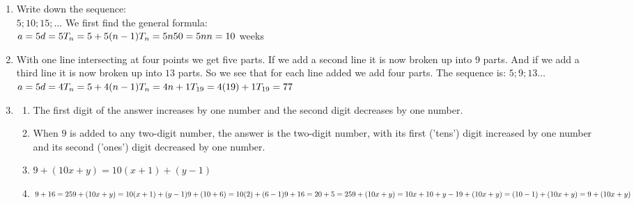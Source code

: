 \begin{eocsolutions}{}
{\begin{enumerate}[itemsep=5pt, label=\textbf{\arabic*}. ]
\begin{enumerate}[noitemsep, label=\textbf{(\alph*)} ]
  \item The first term is 4 since this is the number of matches needed for 1 square.
  \item The common difference between the terms is $3$. ($7 -4 = 3$ ; $10 - 7 = 3$)
  \item $T_n = 4 + 3(n -1)\\
T_n = 3n + 1$
  \item $T_25 = 3(25) + 1 \\
= 76$
  \end{enumerate}   
\item Write down the sequence:\\
$5 ; 10 ; 15 ; \ldots$
We first find the general formula:\\
$a = 5\\
d = 5\\
T_n = 5 + 5(n - 1)\\
T_n = 5n  \\
50 = 5n \\
n = 10 $ weeks
\item With one line intersecting at four points we get five parts. If we add a second line it is now broken up into 9 parts. And if we add a third line it is now broken up into $13$ parts. So we see that for each line added we add four parts. The sequence is: $5 ; 9 ; 13 \ldots$\\
$a = 5\\
d = 4\\
T_n = 5 + 4(n - 1)\\
T_n = 4n + 1  \\
T_{19} = 4(19) + 1 \\
T_{19} = 77 $
\item 
  \begin{enumerate}[noitemsep, label=\textbf{(\alph*)} ]
  \item The first digit of the answer increases by one number and the second digit decreases by one number.
  \item When $9$ is added to any two-digit number, the answer is the two-digit number, with its first ('tens') digit increased by one number and its second ('ones') digit decreased by one number.
  \item $9 + (10x + y) = 10(x+1)+(y-1)$
  \item $9 + 16 = 25\\
9 + (10x + y) = 10(x + 1) + (y-1)\\
9 + (10 + 6) = 10(2) + (6-1)\\
9 + 16 = 20 + 5 = 25\\
9 + (10x + y) = 10x + 10 + y - 1\\
9 + (10x + y) = (10 - 1) + (10x + y) 
= 9 + (10x + y)$
  \end{enumerate}
\end{enumerate}}
\end{eocsolutions}


